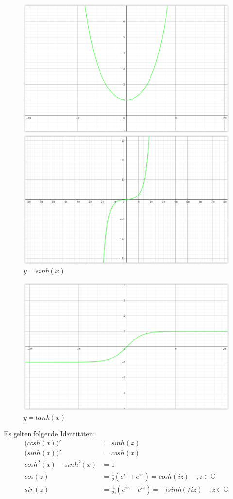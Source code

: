 \documentclass[12pt,a4paper]{article}%
\numberwithin{equation}{section}
\newcommand{\C}{\mathbb{C}}
\numberwithin{equation}{subsection}
\begin{document}
		\vspace{-0.7cm}  	  
	  \begin{figure}[H] 
		\centering
		\begin{minipage}{.5\textwidth}
		  \centering
		  \includegraphics[width=0.8\linewidth]{funktionen_cosh.png}
		  \caption{$y = cosh(x)$}
		  \label{fig:funkt_cosh}
		\end{minipage}%
		\begin{minipage}{.5\textwidth}
		  \centering
		  \includegraphics[width=0.8\linewidth]{funktionen_sinh.png}
		  \caption{$y = sinh(x)$}
		  \label{fig:funkt_sinh}
		\end{minipage}
		\end{figure}
		\vspace{-0.5cm}
		\begin{figure}[H]
		  \centering
		  \includegraphics[width=0.4\linewidth]{funktionen_tanh.png}
		  \caption{$y = tanh(x)$}
		  \label{fig:funkt_tanh}
		\end{figure}
		Es gelten folgende Identitäten:
		\begin{align}
		  \big(cosh(x)\big)' &= sinh(x) \\
		  \big(sinh(x)\big)' &= cosh(x) \\
		  cosh^2(x) - sinh^2(x) &= 1 \\
		  cos(z) &= \frac{1}{2}\left(e^{iz}+e^{iz}\right) = cosh(iz) \quad , z \in \C \\
		  sin(z) &= \frac{1}{2i}\left( e^{iz} - e^{iz}\right) = -isinh(/iz) \quad , z \in \C
		\end{align}
\newpage
\end{document}
